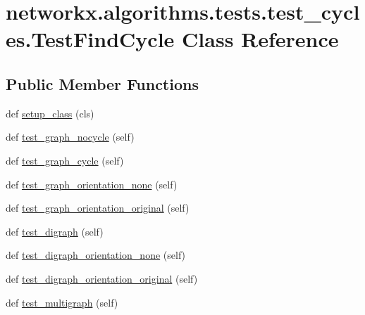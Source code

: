 \hypertarget{classnetworkx_1_1algorithms_1_1tests_1_1test__cycles_1_1TestFindCycle}{}\section{networkx.\+algorithms.\+tests.\+test\+\_\+cycles.\+Test\+Find\+Cycle Class Reference}
\label{classnetworkx_1_1algorithms_1_1tests_1_1test__cycles_1_1TestFindCycle}
\subsection*{Public Member Functions}
\begin{DoxyCompactItemize}
\item 
def \hyperlink{classnetworkx_1_1algorithms_1_1tests_1_1test__cycles_1_1TestFindCycle_abd23a0b9b3e003100f78a820a1135dac}{setup\+\_\+class} (cls)
\item 
def \hyperlink{classnetworkx_1_1algorithms_1_1tests_1_1test__cycles_1_1TestFindCycle_acc9c30fcbd417a5b601b057f4522bd4b}{test\+\_\+graph\+\_\+nocycle} (self)
\item 
def \hyperlink{classnetworkx_1_1algorithms_1_1tests_1_1test__cycles_1_1TestFindCycle_a7a8a0d862d864d53b4bb16f24e0d029d}{test\+\_\+graph\+\_\+cycle} (self)
\item 
def \hyperlink{classnetworkx_1_1algorithms_1_1tests_1_1test__cycles_1_1TestFindCycle_afa728bc191cb817da9c3b0128bd00105}{test\+\_\+graph\+\_\+orientation\+\_\+none} (self)
\item 
def \hyperlink{classnetworkx_1_1algorithms_1_1tests_1_1test__cycles_1_1TestFindCycle_a3d02aa502624dc01125770fe0cec3cb1}{test\+\_\+graph\+\_\+orientation\+\_\+original} (self)
\item 
def \hyperlink{classnetworkx_1_1algorithms_1_1tests_1_1test__cycles_1_1TestFindCycle_a291d53335ad3626376bf76dec3cf37c4}{test\+\_\+digraph} (self)
\item 
def \hyperlink{classnetworkx_1_1algorithms_1_1tests_1_1test__cycles_1_1TestFindCycle_aa5a753c357d3e6daaeabf1f582aba0c5}{test\+\_\+digraph\+\_\+orientation\+\_\+none} (self)
\item 
def \hyperlink{classnetworkx_1_1algorithms_1_1tests_1_1test__cycles_1_1TestFindCycle_a455fa3444a23ca79602e10e73b8ec548}{test\+\_\+digraph\+\_\+orientation\+\_\+original} (self)
\item 
def \hyperlink{classnetworkx_1_1algorithms_1_1tests_1_1test__cycles_1_1TestFindCycle_a206c2bbc2f2f1adcfb5e0fa0e23aefcb}{test\+\_\+multigraph} (self)

\end{DoxyCompactItemize}
